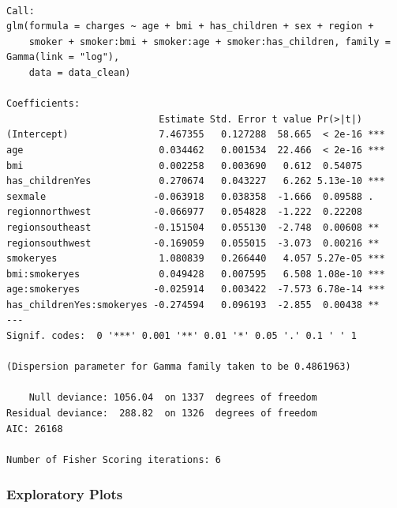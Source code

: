 \documentclass[
  letterpaper,
  DIV=11,
  numbers=noendperiod]{scrartcl}
\begin{document}
\begin{verbatim}

Call:
glm(formula = charges ~ age + bmi + has_children + sex + region + 
    smoker + smoker:bmi + smoker:age + smoker:has_children, family = Gamma(link = "log"), 
    data = data_clean)

Coefficients:
                           Estimate Std. Error t value Pr(>|t|)    
(Intercept)                7.467355   0.127288  58.665  < 2e-16 ***
age                        0.034462   0.001534  22.466  < 2e-16 ***
bmi                        0.002258   0.003690   0.612  0.54075    
has_childrenYes            0.270674   0.043227   6.262 5.13e-10 ***
sexmale                   -0.063918   0.038358  -1.666  0.09588 .  
regionnorthwest           -0.066977   0.054828  -1.222  0.22208    
regionsoutheast           -0.151504   0.055130  -2.748  0.00608 ** 
regionsouthwest           -0.169059   0.055015  -3.073  0.00216 ** 
smokeryes                  1.080839   0.266440   4.057 5.27e-05 ***
bmi:smokeryes              0.049428   0.007595   6.508 1.08e-10 ***
age:smokeryes             -0.025914   0.003422  -7.573 6.78e-14 ***
has_childrenYes:smokeryes -0.274594   0.096193  -2.855  0.00438 ** 
---
Signif. codes:  0 '***' 0.001 '**' 0.01 '*' 0.05 '.' 0.1 ' ' 1

(Dispersion parameter for Gamma family taken to be 0.4861963)

    Null deviance: 1056.04  on 1337  degrees of freedom
Residual deviance:  288.82  on 1326  degrees of freedom
AIC: 26168

Number of Fisher Scoring iterations: 6
\end{verbatim}

\subsubsection{Exploratory Plots}\label{exploratory-plots}
\end{document}
